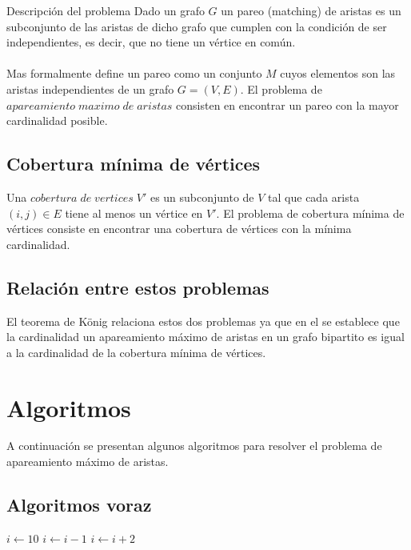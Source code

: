 \documentclass[12pt,a4paper]{article}
\begin{document}
\begin{section}{Descripción del problema} \noindent 
Dado un grafo $G$ un pareo (matching) de aristas es un subconjunto de las aristas de dicho grafo que cumplen con la condición de ser independientes, es decir, que no tiene un vértice en común\cite{le2014algorithms}.\\\\
Mas formalmente \cite{butenko2003maximum} define un pareo como un conjunto $M$ cuyos elementos son las aristas independientes de un grafo $G=(V,E)$. El problema de $apareamiento\; maximo\; de\; aristas$ consisten en encontrar un pareo con la mayor cardinalidad posible.
\subsection{Cobertura mínima de vértices} \noindent 
Una $cobertura\; de\; vertices\; V'$ es un subconjunto de $V$ tal que cada arista $(i,j) \in E$ tiene al menos un vértice en $V'$. El problema de cobertura mínima de vértices consiste en encontrar una cobertura de vértices con la mínima cardinalidad\cite{butenko2003maximum}.
\subsection{Relación entre estos problemas} \noindent 
El teorema de König relaciona estos dos problemas ya que en el se establece que la cardinalidad un apareamiento máximo de aristas en un grafo bipartito es igual a la cardinalidad de la cobertura mínima de vértices\cite{rizzi2000short}. 
\end{section}

\begin{center}
\end{center}

\section{Algoritmos} \noindent 
A continuación se presentan algunos algoritmos para resolver el problema de apareamiento máximo de aristas.

\subsection{Algoritmos voraz}
\begin{algorithmic}
\STATE $i\gets 10$
        \STATE $i\gets i-1$
\ELSE
                \STATE $i\gets i+2$
        \ENDIF
\ENDIF 
\end{algorithmic}
\end{document}
